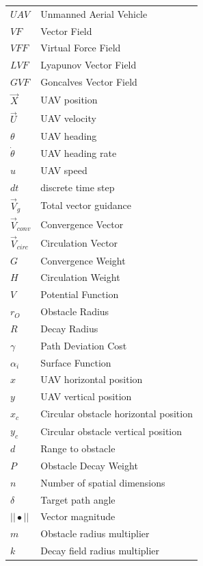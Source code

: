 \documentclass[conf]{new-aiaa}
\begin{document}
{\renewcommand\arraystretch{1.0}
\noindent\begin{longtable*}{@{}l @{\quad=\quad} l@{}}
$UAV$  & Unmanned Aerial Vehicle \\
$VF$   & Vector Field \\
$VFF$  & Virtual Force Field \\
$LVF$  & Lyapunov Vector Field \\
$GVF$  & Goncalves Vector Field \\
$\overrightarrow{X}$  & UAV position \\
$\overrightarrow{U}$  & UAV velocity \\
$\theta$  & UAV heading \\
$\dot{\theta}$  & UAV heading rate \\
$u$  & UAV speed \\
$dt$  & discrete time step\\


$\overrightarrow{V}_{g}$  	 & Total vector guidance\\
$\overrightarrow{V}_{conv}$  & Convergence Vector\\
$\overrightarrow{V}_{circ}$  & Circulation Vector\\

$G$  & Convergence Weight\\
$H$  & Circulation Weight\\
$V$  & Potential Function\\

$r_O$  & Obstacle Radius\\
$R$  & Decay Radius\\
$\gamma$  & Path Deviation Cost\\
$\alpha_i$  & Surface Function\\

$x$  & UAV horizontal position\\
$y$  & UAV vertical position\\

$x_c$  & Circular obstacle horizontal position\\
$y_c$  & Circular obstacle vertical position\\

$d$  & Range to obstacle\\

$P$  & Obstacle Decay Weight\\
$n$  & Number of spatial dimensions\\
$\delta$  & Target path angle \\
$||\bullet || $  & Vector magnitude \\
$m$  & Obstacle radius multiplier \\
$k$  & Decay field radius multiplier \\




\end{longtable*}}
\end{document}
